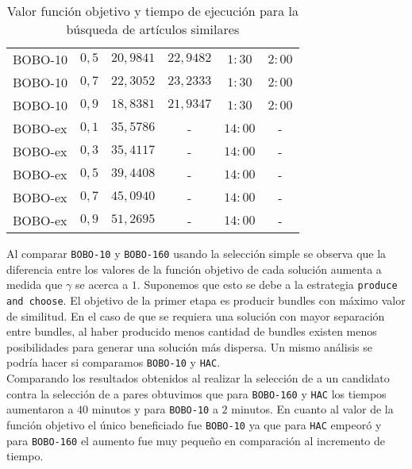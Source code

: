 \begin{table}[H]
{\begin{tabular}{|lc|cccc|}
    BOBO-10 & $0,5$ & $20,9841$  & $22,9482$ & $1:30$ & $2:00$ \\
    BOBO-10 & $0,7$ & $22,3052$  & $23,2333$ & $1:30$ & $2:00$ \\
    BOBO-10 & $0,9$ & $18,8381$  & $21,9347$ & $1:30$ & $2:00$ \\
    BOBO-ex & $0,1$ & $35,5786$  & - & $14:00$ & - \\
    BOBO-ex & $0,3$ & $35,4117$  & - & $14:00$ & - \\
    BOBO-ex & $0,5$ & $39,4408$  & - & $14:00$ & - \\
    BOBO-ex & $0,7$ & $45,0940$  & - & $14:00$ & - \\
    BOBO-ex & $0,9$ & $51,2695$  & - & $14:00$ & - \\
    \hline
    \end{tabular}
  }
  \caption {Valor función objetivo y tiempo de ejecución para la búsqueda de artículos similares}
\end{table}
Al comparar \texttt{BOBO-10} y \texttt{BOBO-160} usando la selección simple se observa que la 
diferencia entre los valores de la función objetivo de cada solución aumenta a medida que $\gamma$ 
se acerca a $1$. Suponemos que esto se debe a la estrategia \texttt{produce and choose}. El 
objetivo de la primer etapa es producir bundles con máximo valor de similitud. En el caso de que se 
requiera una solución con mayor separación entre bundles, al haber producido menos cantidad de 
bundles existen menos posibilidades para generar una solución más dispersa. Un mismo análisis se 
podría hacer si comparamos \texttt{BOBO-10} y \texttt{HAC}.\\
Comparando los resultados obtenidos al realizar la selección de a un candidato contra la selección 
de a pares obtuvimos que para \texttt{BOBO-160} y \texttt{HAC} los tiempos aumentaron a $40$ 
minutos y para \texttt{BOBO-10} a $2$ minutos. En cuanto al valor de la función objetivo el único 
beneficiado fue \texttt{BOBO-10} ya que para \texttt{HAC} empeoró y para \texttt{BOBO-160} el 
aumento fue muy pequeño en comparación al incremento de tiempo.
